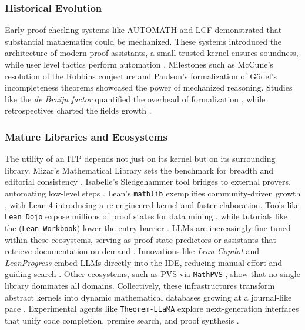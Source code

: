 \documentclass[acmsmall,anonymous]{acmart}
\begin{document}
\subsubsection{Historical Evolution}\label{sec:history}
Early proof-checking systems like AUTOMATH and LCF demonstrated that substantial mathematics could be mechanized. These systems introduced the architecture of modern proof assistants, a small trusted kernel ensures soundness, while user level tactics perform automation \cite{paulson1986natural,paulson1988preliminary}.  Milestones such as McCune’s resolution of the Robbins conjecture \cite{mccune1997solution} and Paulson’s formalization of Gödel’s incompleteness theorems \cite{paulson2013godel} showcased the power of mechanized reasoning.  Studies like the \emph{de Bruijn factor} quantified the overhead of formalization \cite{wiedijk2012de}, while retrospectives charted the fields growth \cite{debruijn1994survey,harrison2014history}.

\subsubsection{Mature Libraries and Ecosystems}\label{sec:libraries}
The utility of an ITP depends not just on its kernel but on its surrounding library. Mizar's Mathematical Library sets the benchmark for breadth and editorial consistency \cite{bancerek2018role}. Isabelle's Sledgehammer tool bridges to external provers, automating low-level steps \cite{bohme2010sledgehammer}.  Lean’s \texttt{mathlib} exemplifies community-driven growth \cite{moura2021lean,mathlib4}, with Lean 4 introducing a re-engineered kernel and faster elaboration.  Tools like \texttt{Lean Dojo} expose millions of proof states for data mining \cite{yang2023leandojo}, while tutorials like the (\texttt{Lean Workbook}) lower the entry barrier \cite{ying2024leanworkbook,ying2024leanworkbook}.  LLMs are increasingly fine-tuned within these ecosystems, serving as proof-state predictors \cite{li2023aiformathematics,li2024leanreasoner} or assistants that retrieve documentation on demand \cite{song2024towards}. Innovations like \emph{Lean Copilot} and \emph{LeanProgress} embed LLMs directly into the IDE, reducing manual effort and guiding search \cite{huang2024leancopilot, huang2025leanprogress}. Other ecosystems, such as PVS via \texttt{MathPVS} \cite{saidi2023mathPVS}, show that no single library dominates all domains. Collectively, these infrastructures transform abstract kernels into dynamic mathematical databases growing at a journal-like pace \cite{massot2023mathematics}.  Experimental agents like \texttt{Theorem‐LLaMA} explore next-generation interfaces that unify code completion, premise search, and proof synthesis \cite{gu2024theoremllama}.
\end{document}
